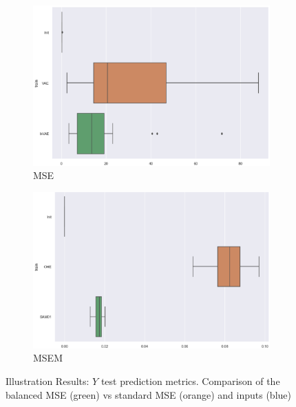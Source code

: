 \documentclass{article}
\theoremstyle{definition}
\begin{document}
\begin{figure}[ht]
     \centering
     \begin{subfigure}[b]{0.22\textwidth}
         \centering
         \includegraphics[width=\textwidth]{imgs/VAE/Boxplot_MSE.png}
         \caption{MSE}
         \label{MSE}
     \end{subfigure}
     \begin{subfigure}[b]{0.22\textwidth}
         \centering
         \includegraphics[width=\textwidth]{imgs/VAE/Boxplot_MSEM.png}
         \caption{MSEM}
         \label{MSEM_VAE}
     \end{subfigure}
     \caption{Illustration Results: $Y$ test prediction metrics. Comparison of the balanced MSE (green) vs standard MSE (orange) and inputs (blue)}
     \label{Results_VAE}
\end{figure}
\end{document}
